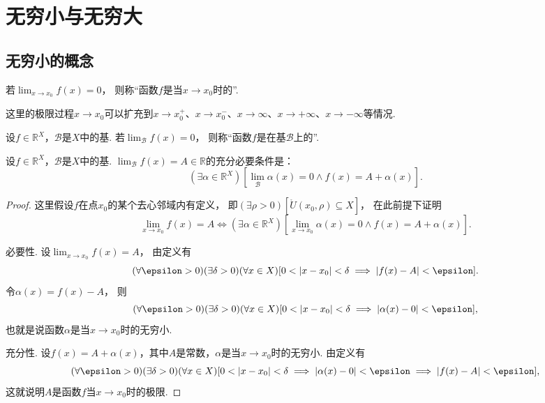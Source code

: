 \section{无穷小与无穷大}
\subsection{无穷小的概念}
\begin{definition}
若\(\lim_{x \to x_0} f(x) = 0\)，
则称“函数\(f\)是当\(x \to x_0\)时的”.
\end{definition}
这里的极限过程\(x \to x_0\)可以扩充到\(x \to x_0^+\)、\(x \to x_0^-\)、\(x \to \infty\)、\(x \to +\infty\)、\(x \to -\infty\)等情况.

\begin{definition}
设\(f\in\mathbb{R}^X\)，\(\mathcal{B}\)是\(X\)中的基.
若\(\lim_\mathcal{B} f(x) = 0\)，
则称“函数\(f\)是在基\(\mathcal{B}\)上的”.
\end{definition}

\begin{theorem}
设\(f\in\mathbb{R}^X\)，\(\mathcal{B}\)是\(X\)中的基.
\(\lim_\mathcal{B} f(x) = A \in \mathbb{R}\)的充分必要条件是：\[
	(\exists\alpha\in\mathbb{R}^X)
	\left[
		\lim_\mathcal{B} \alpha(x) = 0
		\land
		f(x) = A + \alpha(x)
	\right].
\]
\begin{proof}
这里假设\(f\)在点\(x_0\)的某个去心邻域内有定义，
即\((\exists\rho>0)[\mathring{U}(x_0,\rho) \subseteq X]\)，
在此前提下证明\[
	\lim_{x \to x_0} f(x) = A
	\iff
	(\exists\alpha\in\mathbb{R}^X)
	\left[
		\lim_{x \to x_0} \alpha(x) = 0
		\land
		f(x) = A + \alpha(x)
	\right].
\]

必要性.
设\(\lim_{x \to x_0} f(x) = A\)，
由定义有\[
	(\forall\epsilon>0)
	(\exists\delta>0)
	(\forall x\in X)
	[
		0<\abs{x-x_0}<\delta
		\implies
		\abs{f(x)-A}<\epsilon
	].
\]
令\(\alpha(x)=f(x)-A\)，
则\[
	(\forall\epsilon>0)
	(\exists\delta>0)
	(\forall x\in X)
	[
		0<\abs{x-x_0}<\delta
		\implies
		\abs{\alpha(x)-0}<\epsilon
	],
\]
也就是说函数\(\alpha\)是当\(x \to x_0\)时的无穷小.

充分性.
设\(f(x)=A+\alpha(x)\)，其中\(A\)是常数，\(\alpha\)是当\(x \to x_0\)时的无穷小.
由定义有\[
	(\forall\epsilon>0)
	(\exists\delta>0)
	(\forall x\in X)
	[
		0<\abs{x-x_0}<\delta
		\implies
		\abs{\alpha(x)-0}<\epsilon
		\implies
		\abs{f(x)-A}<\epsilon
	],
\]
这就说明\(A\)是函数\(f\)当\(x \to x_0\)时的极限.
\end{proof}
\end{theorem}

